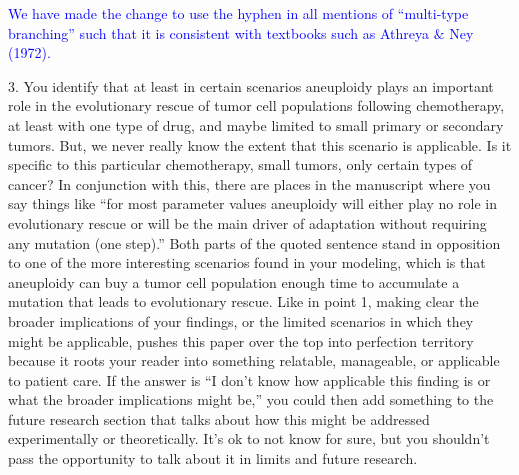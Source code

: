 \documentclass[12pt]{extarticle}
\begin{document}
\textcolor{blue}{%
We have made the change to use the hyphen in all mentions of ``multi-type branching'' such that it is consistent with textbooks such as Athreya $\&$ Ney (1972).
} 

3. You identify that at least in certain scenarios aneuploidy plays an important role in the evolutionary rescue of tumor cell populations following chemotherapy, at least with one type of drug, and maybe limited to small primary or secondary tumors. But, we never really know the extent that this scenario is applicable. Is it specific to this particular chemotherapy, small tumors, only certain types of cancer? In conjunction with this, there are places in the manuscript where you say things like ``for most parameter values aneuploidy will either play no role in evolutionary rescue or will be the main driver of adaptation without requiring any mutation (one step).'' Both parts of the quoted sentence stand in opposition to one of the more interesting scenarios found in your modeling, which is that aneuploidy can buy a tumor cell population enough time to accumulate a mutation that leads to evolutionary rescue. Like in point 1, making clear the broader implications of your findings, or the limited scenarios in which they might be applicable, pushes this paper over the top into perfection territory because it roots your reader into something relatable, manageable, or applicable to patient care. If the answer is ``I don't know how applicable this finding is or what the broader implications might be,'' you could then add something to the future research section that talks about how this might be addressed experimentally or theoretically. It's ok to not know for sure, but you shouldn't pass the opportunity to talk about it in limits and future research.
\end{document}
